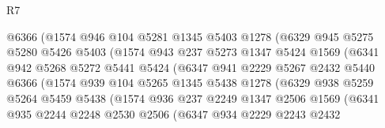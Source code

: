 \begin{lexlean}{R7}
\begin{coremodule}
                        @6366
                        (@1574
                          @946
                          @104
                          @5281
                          @1345
                          @5403
                          @1278
                          (@6329
                            @945
                            @5275
                            @5280
                            @5426
                            @5403
                            (@1574
                              @943
                              @237
                              @5273
                              @1347
                              @5424
                              @1569
                              (@6341
                                @942
                                @5268
                                @5272
                                @5441
                                @5424
                                (@6347
                                  @941
                                  @2229
                                  @5267
                                  @2432
                                  @5440
                                  @6366
                                  (@1574
                                    @939
                                    @104
                                    @5265
                                    @1345
                                    @5438
                                    @1278
                                    (@6329
                                      @938
                                      @5259
                                      @5264
                                      @5459
                                      @5438
                                      (@1574
                                        @936
                                        @237
                                        @2249
                                        @1347
                                        @2506
                                        @1569
                                        (@6341
                                          @935
                                          @2244
                                          @2248
                                          @2530
                                          @2506
                                          (@6347
                                            @934
                                            @2229
                                            @2243
                                            @2432

\end{coremodule}
\end{lexlean}
